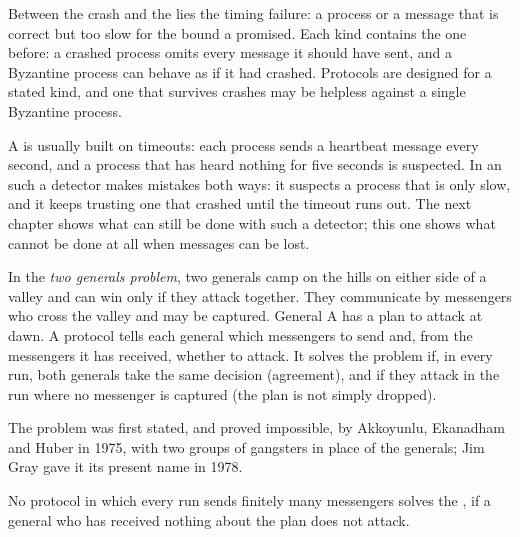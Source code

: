 Between the crash and the  lies the timing failure: a process or a message that is correct but too slow for the bound a  promised. Each kind contains the one before: a crashed process omits every message it should have sent, and a Byzantine process can behave as if it had crashed. Protocols are designed for a stated kind, and one that survives crashes may be helpless against a single Byzantine process.

A  is usually built on timeouts: each process sends a heartbeat message every second, and a process that has heard nothing for five seconds is suspected. In an  such a detector makes mistakes both ways: it suspects a process that is only slow, and it keeps trusting one that crashed until the timeout runs out. The next chapter shows what can still be done with such a detector; this one shows what cannot be done at all when messages can be lost.

\begin{definition}\label{def:b3:distributed-systems:generals}
In the \emph{two generals problem}, two generals camp on the hills on either side of a valley and can win only if they attack together. They communicate by messengers who cross the valley and may be captured. General A has a plan to attack at dawn. A protocol tells each general which messengers to send and, from the messengers it has received, whether to attack. It solves the problem if, in every run, both generals take the same decision (agreement), and if they attack in the run where no messenger is captured (the plan is not simply dropped).
\end{definition}

The problem was first stated, and proved impossible, by Akkoyunlu, Ekanadham and Huber in 1975, with two groups of gangsters in place of the generals; Jim Gray gave it its present name in 1978. %

\begin{theorem}\label{thm:b3:distributed-systems:generals}
No protocol in which every run sends finitely many messengers solves the , if a general who has received nothing about the plan does not attack.
\end{theorem}

